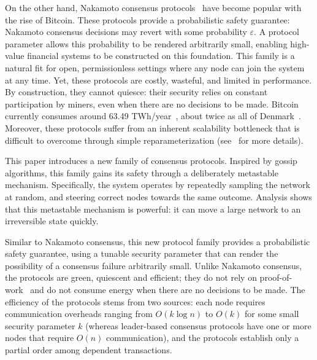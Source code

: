 \documentclass[letterpaper,twocolumn,10pt]{article}
\newcommand{\tronly}[2]{#1}
\theoremstyle{definition}
\newcommand{\Jon}[1]{{\color{blue} \textbf{Jon: } #1}}
\begin{document}
On the other hand, Nakamoto consensus protocols~\cite{nakamoto2008bitcoin,GarayKL15, PassSS17, SompolinskyZ15, SompolinskyLZ16, SompolinskyZ18, BentovHMN17, EyalGSR16,Kokoris-KogiasJ16,PassS16a, PassS18} have become popular with the rise of Bitcoin.
These protocols provide a probabilistic safety guarantee: Nakamoto consensus decisions may revert with some probability $\varepsilon$.
A protocol parameter allows this probability to be rendered arbitrarily small\tronly{, enabling high-value financial systems to be constructed on this foundation.}{.}
This family is a natural fit for open, permissionless settings where any node can join the system at any time.
Yet, these protocols are costly, wasteful, and limited in performance.
By construction, they cannot quiesce: their security relies on constant participation by miners, even when there are no decisions to be made.
\tronly{Bitcoin currently consumes around 63.49 TWh/year~\cite{bitcoinpower}, about twice as all of Denmark~\cite{denmarkpower}.}{}
Moreover, these protocols suffer from an inherent scalability bottleneck that is difficult to overcome through simple reparameterization (see~\cite{CromanDEGJKMSSS16} for more details). %

This paper introduces a new family of consensus protocols.
Inspired by gossip algorithms, this family gains its safety through a deliberately metastable mechanism.
Specifically, the system operates by repeatedly sampling the network at random, and steering correct nodes towards the same outcome.
Analysis shows that this metastable mechanism is powerful: it can move a large network to an irreversible state quickly.

Similar to Nakamoto consensus, this new protocol family provides a probabilistic safety guarantee, using a tunable security parameter that can render the possibility of a consensus failure arbitrarily small.
Unlike Nakamoto consensus, the protocols are green, quiescent and efficient; they do not rely on proof-of-work~\cite{DworkN92} and do not consume energy when there are no decisions to be made.
The efficiency of the protocols stems from two sources: each node requires communication overheads ranging from $O(k \log n)$ to $O(k)$ for some small security parameter $k$ (whereas leader-based consensus protocols have one or more nodes that require $O(n)$ communication), and the protocols establish only a partial order among dependent transactions.
\end{document}
